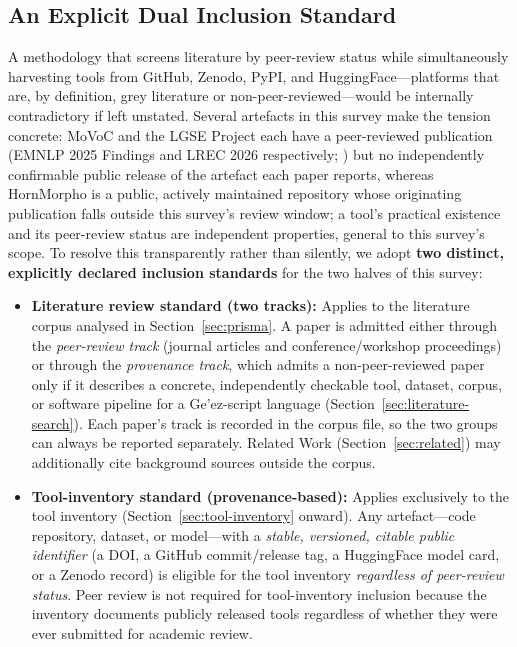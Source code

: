 \documentclass[sn-mathphys-num]{sn-jnl}
\theoremstyle{thmstyleone}
\theoremstyle{thmstyletwo}
\theoremstyle{thmstylethree}
\begin{document}
\subsection{An Explicit Dual Inclusion Standard}\label{sec:dual-standard}

A methodology that screens literature by peer-review status while simultaneously harvesting tools from GitHub, Zenodo, PyPI, and HuggingFace---platforms that are, by definition, grey literature or non-peer-reviewed---would be internally contradictory if left unstated. Several artefacts in this survey make the tension concrete: MoVoC and the LGSE Project each have a peer-reviewed publication (EMNLP 2025 Findings and LREC 2026 respectively; \citealp{teklehaymanot_movoc_2025,teklehaymanot_lgse_2026}) but no independently confirmable public release of the artefact each paper reports, whereas HornMorpho is a public, actively maintained repository whose originating publication \citep{gasser_hornmorpho_2011} falls outside this survey's review window; a tool's practical existence and its peer-review status are independent properties, general to this survey's scope. To resolve this transparently rather than silently, we adopt \textbf{two distinct, explicitly declared inclusion standards} for the two halves of this survey:

\begin{itemize}
    \item \textbf{Literature review standard (two tracks):} Applies to the literature corpus analysed in Section~\ref{sec:prisma}. A paper is admitted either through the \emph{peer-review track} (journal articles and conference/workshop proceedings) or through the \emph{provenance track}, which admits a non-peer-reviewed paper only if it describes a concrete, independently checkable tool, dataset, corpus, or software pipeline for a Ge'ez-script language (Section~\ref{sec:literature-search}). Each paper's track is recorded in the corpus file, so the two groups can always be reported separately. Related Work (Section~\ref{sec:related}) may additionally cite background sources outside the corpus.
    \item \textbf{Tool-inventory standard (provenance-based):} Applies exclusively to the tool inventory (Section~\ref{sec:tool-inventory} onward). Any artefact---code repository, dataset, or model---with a \emph{stable, versioned, citable public identifier} (a DOI, a GitHub commit/release tag, a HuggingFace model card, or a Zenodo record) is eligible for the tool inventory \emph{regardless of peer-review status}. Peer review is not required for tool-inventory inclusion because the inventory documents publicly released tools regardless of whether they were ever submitted for academic review.
\end{itemize}
\end{document}
